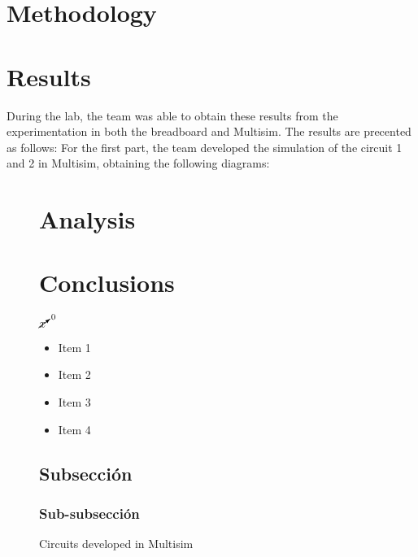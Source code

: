 \documentclass[12pt]{article}  %
\begin{document}
\section{Methodology} %

\section{Results} %
During the lab, the team was able to obtain these results from the experimentation in both the breadboard and Multisim. The results are precented as follows:
For the first part, the team developed the simulation of the circuit 1 and 2 in Multisim, obtaining the following diagrams:
\begin{figure}[H]
    \centering
    \hfill
    \caption{Circuits developed in Multisim}
    \label{fig:multisim_circuits}
\section{Analysis} %
\section{Conclusions} %
\cite{gh1562} %

$\cancelto{0}{x}$ %
\begin{itemize}
    \item Item 1
    \item Item 2
    \item Item 3
    \item Item 4
\end{itemize}

\subsection{Subsección}
\cite{Agarwal2019} %
\subsubsection{Sub-subsección}


\newpage


\end{figure}
\end{document}
